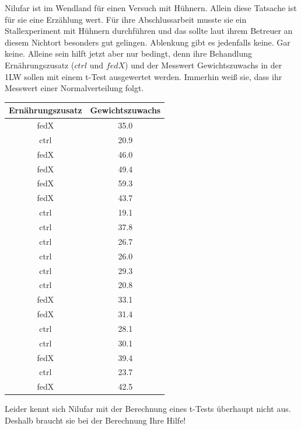 \documentclass[a4paper, 9pt]{scrartcl}\usepackage[]{graphicx}\usepackage[]{xcolor}
\begin{document}
Nilufar ist im Wendland für einen Versuch mit Hühnern. Allein diese Tatsache ist für sie eine Erzählung wert. Für ihre Abschlussarbeit musste sie ein Stallexperiment mit Hühnern durchführen und das sollte laut ihrem Betreuer an diesem Nichtort besonders gut gelingen. Ablenkung gibt es jedenfalls keine. Gar keine. Alleine sein hilft jetzt aber nur bedingt, denn ihre Behandlung Ernährungszusatz ($ctrl$ und $fedX$) und der Messwert Gewichtszuwachs in der 1LW sollen mit einem t-Test ausgewertet werden. Immerhin weiß sie, dass ihr Messwert einer Normalverteilung folgt. 

\begin{table}[!h]
\centering
\begin{tabular}{cc}
\toprule
Ernährungszusatz & Gewichtszuwachs\\
\midrule
fedX & 35.0\\
ctrl & 20.9\\
fedX & 46.0\\
fedX & 49.4\\
fedX & 59.3\\
\addlinespace
fedX & 43.7\\
ctrl & 19.1\\
ctrl & 37.8\\
ctrl & 26.7\\
ctrl & 26.0\\
\addlinespace
ctrl & 29.3\\
ctrl & 20.8\\
fedX & 33.1\\
fedX & 31.4\\
ctrl & 28.1\\
\addlinespace
ctrl & 30.1\\
fedX & 39.4\\
ctrl & 23.7\\
fedX & 42.5\\
\bottomrule
\end{tabular}
\end{table}



Leider kennt sich Nilufar mit der Berechnung eines t-Tests überhaupt nicht aus. Deshalb braucht sie bei der Berechnung Ihre Hilfe!
\end{document}
